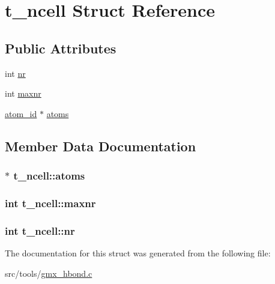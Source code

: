 \hypertarget{structt__ncell}{\section{t\-\_\-ncell \-Struct \-Reference}
\label{structt__ncell}
}
\subsection*{\-Public \-Attributes}
\begin{DoxyCompactItemize}
\item 
int \hyperlink{structt__ncell_a0f53e20e8f7c8546d42c1567ef9993f3}{nr}
\item 
int \hyperlink{structt__ncell_afa7fd59cfa93540fa680ae22a5ec3efb}{maxnr}
\item 
\hyperlink{include_2types_2simple_8h_ad3f47cdb48677e516e2049719612c737}{atom\-\_\-id} $\ast$ \hyperlink{structt__ncell_a4bf52ea3402fed2a1eac3b833658b0e1}{atoms}
\end{DoxyCompactItemize}


\subsection{\-Member \-Data \-Documentation}
\hypertarget{structt__ncell_a4bf52ea3402fed2a1eac3b833658b0e1}{
\subsubsection[{atoms}]{$\ast$ {\bf t\-\_\-ncell\-::atoms}}}\label{structt__ncell_a4bf52ea3402fed2a1eac3b833658b0e1}
\hypertarget{structt__ncell_afa7fd59cfa93540fa680ae22a5ec3efb}{
\subsubsection[{maxnr}]{\setlength{\rightskip}{0pt plus 5cm}int {\bf t\-\_\-ncell\-::maxnr}}}\label{structt__ncell_afa7fd59cfa93540fa680ae22a5ec3efb}
\hypertarget{structt__ncell_a0f53e20e8f7c8546d42c1567ef9993f3}{
\subsubsection[{nr}]{\setlength{\rightskip}{0pt plus 5cm}int {\bf t\-\_\-ncell\-::nr}}}\label{structt__ncell_a0f53e20e8f7c8546d42c1567ef9993f3}


\-The documentation for this struct was generated from the following file\-:\begin{DoxyCompactItemize}
\item 
src/tools/\hyperlink{gmx__hbond_8c}{gmx\-\_\-hbond.\-c}\end{DoxyCompactItemize}
